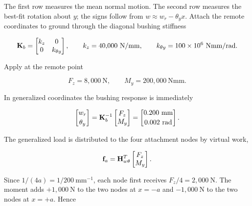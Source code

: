 The first row measures the mean normal motion. The second row measures the
best-fit rotation about $y$; the signs follow from $w\approx w_r-\theta_y x$.
Attach the remote coordinates to ground through the diagonal bushing stiffness

\begin{equation}
    \mathbf{K}_b=
    \begin{bmatrix}
        k_z&0\\0&k_{\theta y}
    \end{bmatrix},
    \qquad
    k_z=40{,}000~\mathrm{N/mm},
    \qquad
    k_{\theta y}=100\times10^6~\mathrm{Nmm/rad}.
\end{equation}

Apply at the remote point

\begin{equation}
    F_z=8{,}000~\mathrm{N},
    \qquad
    M_y=200{,}000~\mathrm{Nmm}.
\end{equation}

In generalized coordinates the bushing response is immediately

\begin{equation}
    \begin{bmatrix}
        w_r\\[2pt]\theta_y
    \end{bmatrix}
    =\mathbf{K}_b^{-1}
    \begin{bmatrix}
        F_z\\M_y
    \end{bmatrix}
    =
    \begin{bmatrix}
        0.200~\mathrm{mm}\\[2pt]0.002~\mathrm{rad}
    \end{bmatrix}.
\end{equation}

The generalized load is distributed to the four attachment nodes by virtual
work,

\begin{equation}
    \mathbf{f}_a=\mathbf{H}_{w\theta}^{T}
    \begin{bmatrix}
        F_z\\M_y
    \end{bmatrix}.
\end{equation}

Since $1/(4a)=1/200~\mathrm{mm}^{-1}$, each node first receives
$F_z/4=2{,}000~\mathrm{N}$. The moment adds $+1{,}000~\mathrm{N}$ to the two
nodes at $x=-a$ and $-1{,}000~\mathrm{N}$ to the two nodes at $x=+a$. Hence

